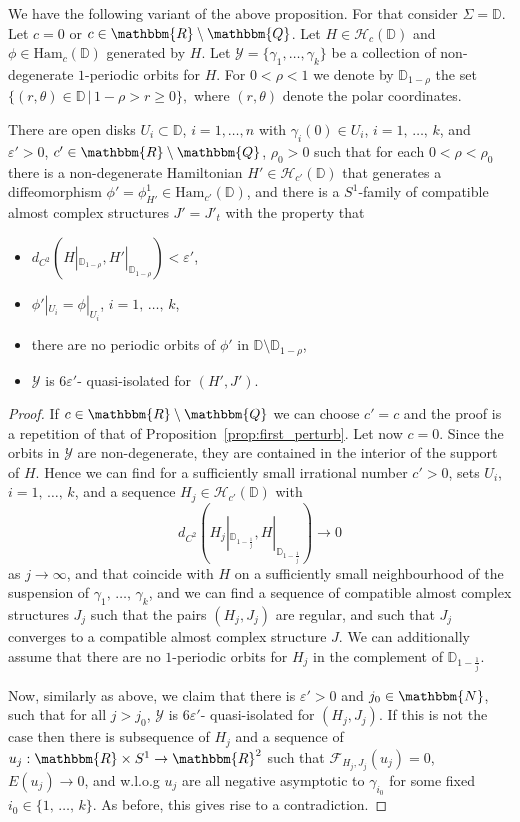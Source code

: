 \documentclass[AHL,Unicode,longabstracts,published]{cedram}
\newcommand{\N}{\mathbbm{N}}
\newcommand{\Q}{\mathbbm{Q}}
\newcommand{\R}{\mathbbm{R}}
\newcommand{\D}{\mathbb{D}}
\newcommand{\Ham}{\mathrm{Ham}}
\newcommand{\clY}{\mathcal{Y}}
\newcommand{\clF}{\mathcal{F}}
\newcommand{\clH}{\mathcal{H}}
\newcounter{claim}
\begin{document}
We have the following variant of the above proposition. For that consider $\Sigma = \D$. Let $c=0$ or $c\in \R \setminus \Q$. Let $H \in \clH_c(\D)$ and $\phi \in \Ham_c(\D)$ generated by $H$. Let $\clY= \{\gamma_1, \ldots, \gamma_k\}$ be a collection of non-degenerate $1$-periodic orbits for $H$. For $0< \rho< 1$ we denote by $\D_{1-\rho}$ the set $\{ (r,\theta) \in \D \, |\, 1-\rho> r \geq 0\},$ where $(r,\theta)$ denote the polar coordinates.

\begin{prop}\label{prop:first_perturbD}
There are open disks $U_i\subset \D$, $i=1, \ldots,n$ with $\gamma_i(0)\in U_i$, $i=1, \,\ldots,\, k$, and $\varepsilon'>0$, $c'\in \R \setminus \Q$, $\rho_0>0$ such that for each $0 < \rho< \rho_0$ there is a non-degenerate Hamiltonian $H' \in \clH_{c'}(\D)$ that generates a diffeomorphism $\phi'= \phi^1_{H'}\in \Ham_{c'}(\D)$, and there is a $S^1$-family of compatible almost complex structures $J'=J'_t$ with the property that
\begin{itemize}
\item $d_{C^2}(H|_{\D_{1-\rho}}, H'|_{\D_{1-\rho}}) < {\varepsilon'}$,
\item $\phi'|_{U_i} = \phi|_{U_i}$, $i=1, \,\ldots,\, k$,
\item there are no periodic orbits of $\phi'$ in $\D \setminus \D_{1-\rho}$,
\item $\clY$ is $6\varepsilon'$- quasi-isolated for $(H', J')$.
\end{itemize}
\end{prop}
\begin{proof}
If $c\in \R \setminus \Q$ we can choose $c'=c$ and the proof is a repetition of that of Proposition~\ref{prop:first_perturb}. Let now $c=0$. Since the orbits in $\clY$ are non-degenerate, they are contained in the interior of the support of $H$. Hence we can find for a sufficiently small irrational number $c'>0$, sets $U_i$, $i=1,\,\ldots,\,k$, and a sequence $H_j\in \clH_{c'}(\D)$ with
\[
d_{C^2}\left(H_j\left|_{\D_{1-\frac{1}{j}}}, H\right|_{\D_{1-\frac{1}{j}}}\right) \to 0
\]
as $j\to \infty$, and that coincide with $H$ on a sufficiently small neighbourhood of the suspension of $\gamma_1, \,\ldots,\, \gamma_k$, and we can find a sequence of compatible almost complex structures $J_j$ such that the pairs $(H_j,J_j)$ are regular, and such that $J_j$ converges to a compatible almost complex structure $J$. We can additionally assume that there are no $1$-periodic orbits for $H_j$ in the complement of $\D_{1-\frac{1}{j}}$.

Now, similarly as above, we claim that there is $\varepsilon'>0$ and $j_0 \in \N$, such that for all $j>j_0$, $\clY$ is $6\varepsilon'$- quasi-isolated for $(H_j,J_j)$. If this is not the case then there is subsequence of $H_j$ and a sequence of $u_{j}: \R \times S^1\to \R^2$ such that $\clF_{H_{j},J_{j}} (u_j)= 0$, $E(u_j) \to 0$, and w.l.o.g $u_{j}$ are all negative asymptotic to $\gamma_{i_0}$ for some fixed $i_0\in \{1, \,\ldots,\, k\}$. As before, this gives rise to a contradiction.
\end{proof}
\end{document}
